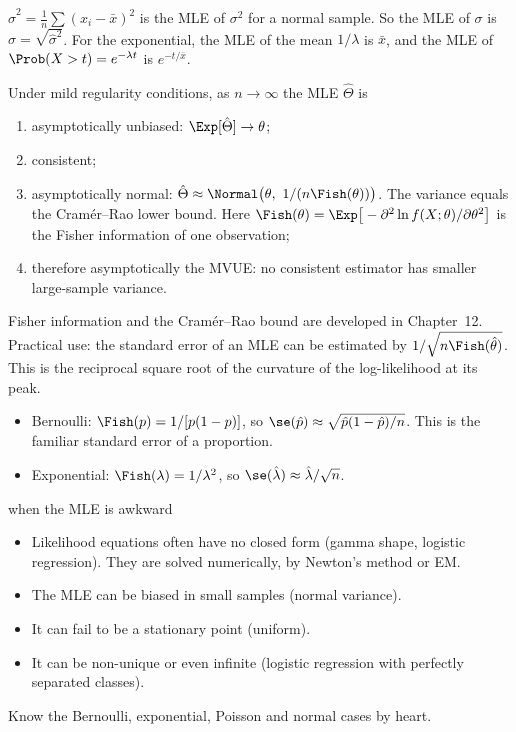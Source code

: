 \begin{example}
$\hat\sigma^2=\frac1n\sum(x_i-\bar{x})^2$ is the MLE of $\sigma^2$ for a normal sample. So the MLE of $\sigma$ is $\hat\sigma=\sqrt{\hat\sigma^2}$. For the exponential, the MLE of the mean $1/\lambda$ is $\bar{x}$, and the MLE of $\Prob(X>t)=e^{-\lambda t}$ is $e^{-t/\bar{x}}$.
\end{example}

\begin{theorem}\label{thm:mleasymp}
Under mild regularity conditions, as $n\to\infty$ the MLE $\hat\Theta$ is
\begin{enumerate}[label=(\roman*)]
  \item asymptotically unbiased: $\Exp[\hat\Theta]\to\theta$;
  \item consistent;
  \item asymptotically normal: $\hat\Theta\approx\Normal\big(\theta,\ 1/(n\Fish(\theta))\big)$. The variance equals the Cram\'er--Rao lower bound. Here $\Fish(\theta)=\Exp\big[-\partial^2\ln f(X;\theta)/\partial\theta^2\big]$ is the Fisher information of one observation;
  \item therefore asymptotically the MVUE: no consistent estimator has smaller large-sample variance.
\end{enumerate}
\end{theorem}

Fisher information and the Cram\'er--Rao bound are developed in Chapter~12. Practical use: the standard error of an MLE can be estimated by $1/\sqrt{n\Fish(\hat\theta)}$. This is the reciprocal square root of the curvature of the log-likelihood at its peak.

\begin{example}
\begin{itemize}
  \item Bernoulli: $\Fish(p)=1/[p(1-p)]$, so $\se(\hat{p})\approx\sqrt{\hat{p}(1-\hat{p})/n}$. This is the familiar standard error of a proportion.
  \item Exponential: $\Fish(\lambda)=1/\lambda^2$, so $\se(\hat\lambda)\approx\hat\lambda/\sqrt n$.
\end{itemize}
\end{example}

\begin{interview}{when the MLE is awkward}
\begin{itemize}
  \item Likelihood equations often have no closed form (gamma shape, logistic regression). They are solved numerically, by Newton's method or EM.
  \item The MLE can be biased in small samples (normal variance).
  \item It can fail to be a stationary point (uniform).
  \item It can be non-unique or even infinite (logistic regression with perfectly separated classes).
\end{itemize}
Know the Bernoulli, exponential, Poisson and normal cases by heart.
\end{interview}

